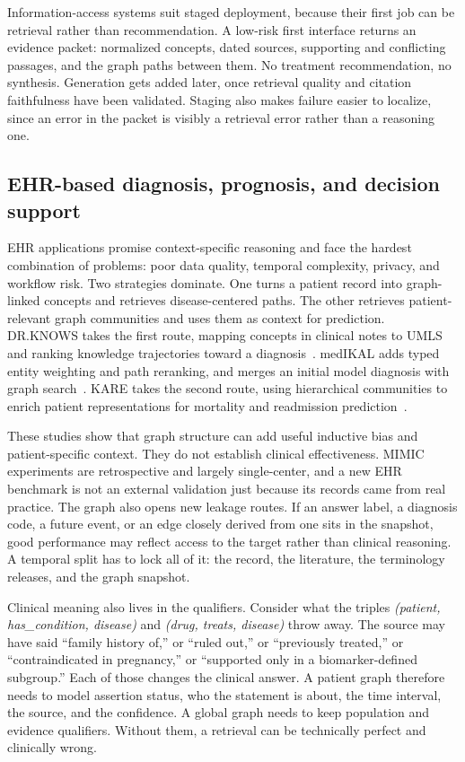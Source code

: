 Information-access systems suit staged deployment, because their first job can be retrieval rather than recommendation. A low-risk first interface returns an evidence packet: normalized concepts, dated sources, supporting and conflicting passages, and the graph paths between them. No treatment recommendation, no synthesis. Generation gets added later, once retrieval quality and citation faithfulness have been validated. Staging also makes failure easier to localize, since an error in the packet is visibly a retrieval error rather than a reasoning one.

\subsection{EHR-based diagnosis, prognosis, and decision support}

EHR applications promise context-specific reasoning and face the hardest combination of problems: poor data quality, temporal complexity, privacy, and workflow risk. Two strategies dominate. One turns a patient record into graph-linked concepts and retrieves disease-centered paths. The other retrieves patient-relevant graph communities and uses them as context for prediction. DR.KNOWS takes the first route, mapping concepts in clinical notes to UMLS and ranking knowledge trajectories toward a diagnosis~\cite{zuo2025drknows}. medIKAL adds typed entity weighting and path reranking, and merges an initial model diagnosis with graph search~\cite{jia2025medikal}. KARE takes the second route, using hierarchical communities to enrich patient representations for mortality and readmission prediction~\cite{jiang2025kare}.

These studies show that graph structure can add useful inductive bias and patient-specific context. They do not establish clinical effectiveness. MIMIC experiments are retrospective and largely single-center, and a new EHR benchmark is not an external validation just because its records came from real practice. The graph also opens new leakage routes. If an answer label, a diagnosis code, a future event, or an edge closely derived from one sits in the snapshot, good performance may reflect access to the target rather than clinical reasoning. A temporal split has to lock all of it: the record, the literature, the terminology releases, and the graph snapshot.

Clinical meaning also lives in the qualifiers. Consider what the triples \emph{(patient, has\_condition, disease)} and \emph{(drug, treats, disease)} throw away. The source may have said ``family history of,'' or ``ruled out,'' or ``previously treated,'' or ``contraindicated in pregnancy,'' or ``supported only in a biomarker-defined subgroup.'' Each of those changes the clinical answer. A patient graph therefore needs to model assertion status, who the statement is about, the time interval, the source, and the confidence. A global graph needs to keep population and evidence qualifiers. Without them, a retrieval can be technically perfect and clinically wrong.

